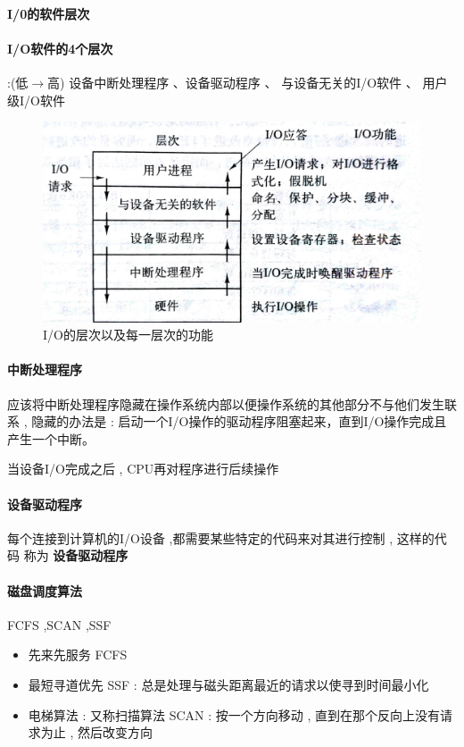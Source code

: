 \documentclass[UTF8,a4paper]{ctexart}
\begin{document}
\paragraph{I/0的软件层次}
\paragraph{I/O软件的4个层次} :(低$\to$高) 设备中断处理程序 、设备驱动程序 、 与设备无关的I/O软件  、 用户级I/O软件
\begin{figure}[H]
	\centering
	\includegraphics[scale = 0.1]{assets/ModernOperatingSystems/2018-01-10-17-11-23.png}
	\caption{I/O的层次以及每一层次的功能}
\end{figure}

\paragraph{中断处理程序}
应该将中断处理程序隐藏在操作系统内部以便操作系统的其他部分不与他们发生联系 , 隐藏的办法是 :
启动一个I/O操作的驱动程序阻塞起来，直到I/O操作完成且产生一个中断。

当设备I/O完成之后 , CPU再对程序进行后续操作

\paragraph{设备驱动程序}
每个连接到计算机的I/O设备 ,都需要某些特定的代码来对其进行控制 , 这样的代码 称为 \textbf{设备驱动程序}


\paragraph{磁盘调度算法} FCFS ,SCAN ,SSF
\begin{itemize}
	\item 先来先服务 FCFS 
	\item 最短寻道优先 SSF : 总是处理与磁头距离最近的请求以使寻到时间最小化
	\item 电梯算法 : 又称扫描算法 SCAN : 按一个方向移动 , 直到在那个反向上没有请求为止 , 然后改变方向
\end{itemize}
\end{document}
